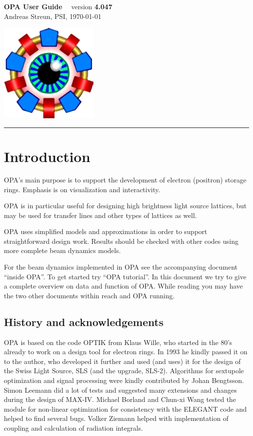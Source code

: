 \documentclass[12pt]{article}
\begin{document}
\noindent

\parbox[t]{0.7\hsize}{
  {\Huge\bf OPA User Guide} ~~version {\bf 4.047} \\
  Andreas Streun, PSI, \today
} \hfill  \includegraphics{opalogo_small.jpg}
\rule{\hsize}{1pt}
\section{Introduction}
OPA's main purpose is to support the development of electron (positron) storage rings. Emphasis is on visualization and interactivity.

OPA is in particular useful for designing high brightness light source lattices, but may be used for transfer lines and other types of lattices as well.

OPA uses simplified models and approximations in order to support straightforward design work. Results should be checked with other codes using more complete beam dynamics models.

For the beam dynamics implemented in OPA see the accompanying document ``inside OPA''. To get started try ``OPA tutorial''. 
In this document we try to give a complete overview on data and function of OPA. While reading you may have the two other documents within reach and OPA running.

\subsection{History and acknowledgements}
OPA is based on the code OPTIK from Klaus Wille,
who started in the 80's already to work on a design tool for electron rings.
In 1993 he kindly passed it on to the author, who developed it further
and used (and uses) it for the design of the Swiss Light Source, SLS (and the upgrade, SLS-2).
Algorithms for sextupole optimization and signal processing were kindly contributed by Johan Bengtsson.
Simon Leemann did a lot of tests and suggested many extensions and changes during the design of MAX-IV. Michael Borland and Chun-xi Wang tested the module for non-linear optimization for consistency with the ELEGANT code and helped to find several bugs. Volker Ziemann helped with implementation of coupling and calculation of radiation integrals.
\end{document}
